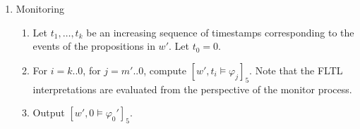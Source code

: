 \documentclass[envcountsame, runningheads]{llncs}
\newcommand{\rednote}[2][]{{\todo[color=magenta!80,size=\footnotesize,#1]{\normalcolor\normalfont#2}}}
\newcommand{\B}{\mathbb{B}}
\newcommand{\?}{\text{?}}
\begin{document}
\begin{enumerate}
		
		\item Monitoring
		\begin{enumerate}[label=\arabic*.]
			\item Let $t_1, \ldots, t_k$ be an increasing sequence of timestamps corresponding to the events of the propositions in $w'$. Let $t_0 = 0$.
			\item For $i = k .. 0$, for $j = m' .. 0$, compute $[w', t_i \models \varphi_j]_5$. Note that the FLTL interpretations are evaluated from the perspective of the monitor process.
			\item Output $[w',0 \models \varphi_0']_5$.
		\end{enumerate}
	\end{enumerate}
	
\end{document}
